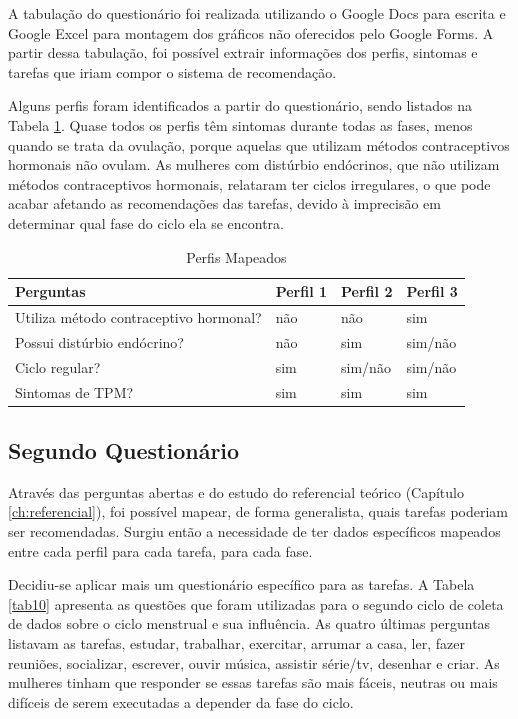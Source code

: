A tabulação do questionário foi realizada utilizando o Google Docs para escrita e Google Excel para montagem 
dos gráficos não oferecidos 
pelo Google Forms. A partir dessa tabulação, foi possível extrair informações dos perfis, 
sintomas e tarefas que iriam compor o sistema de recomendação.

Alguns perfis foram identificados a partir do questionário, sendo listados na Tabela \ref{tab09}. 
Quase todos os perfis têm sintomas durante todas as fases, menos quando se trata da ovulação, porque aquelas 
que utilizam métodos contraceptivos hormonais não ovulam. As mulheres com distúrbio endócrinos, 
que não utilizam métodos contraceptivos hormonais, relataram ter ciclos irregulares, o que pode acabar afetando 
as recomendações das tarefas, devido à imprecisão em determinar qual fase do ciclo ela se encontra.

\begin{table}[htbp] 
    \centering
    \caption{Perfis Mapeados}
    \label{tab09} 
    \begin{tabular}{p{7cm}p{2cm}p{2cm}p{2cm}}
    \toprule
    \textbf{Perguntas} & \textbf{Perfil 1} & \textbf{Perfil 2} & \textbf{Perfil 3}  \\ 
    \midrule     
    Utiliza método contraceptivo hormonal?& não & não & sim \\ 
    \midrule     
    Possui distúrbio endócrino? & não & sim & sim/não \\ 
    \midrule     
    Ciclo regular? & sim & sim/não & sim/não  \\ 
    \midrule     
    Sintomas de TPM? & sim & sim & sim \\ 
    \bottomrule
    \end{tabular}
    \end{table}

\newpage
\subsection{Segundo Questionário}
Através das perguntas abertas e do estudo do referencial teórico (Capítulo \ref{ch:referencial}), 
foi possível mapear, de forma generalista, quais tarefas poderiam ser 
recomendadas. Surgiu então a necessidade de ter dados específicos mapeados entre cada perfil para cada tarefa, 
para cada fase. 

Decidiu-se aplicar mais um questionário específico para as tarefas.
A Tabela \ref{tab10} apresenta as questões que foram utilizadas para o segundo ciclo de coleta 
de dados sobre o ciclo menstrual e 
sua influência. As quatro últimas perguntas listavam as tarefas, estudar, trabalhar, exercitar, arrumar a casa, 
ler, fazer reuniões, socializar, escrever, ouvir música, assistir série/tv, desenhar e criar. As 
mulheres tinham que responder se essas tarefas são mais fáceis, neutras ou mais difíceis de serem executadas 
a depender da fase do ciclo. 

